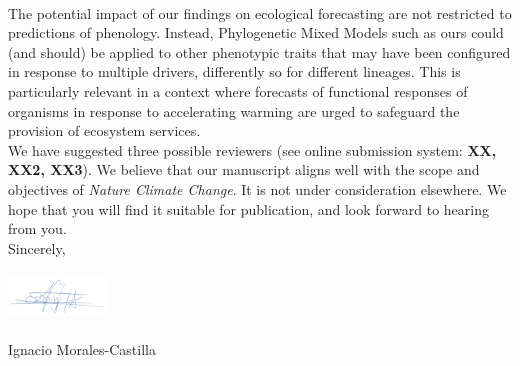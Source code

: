 \documentclass[11pt,a4paper]{letter}
\begin{document}
\begin{letter}{}
\vspace{1.5ex}\\
The potential impact of our findings on ecological forecasting are not restricted to predictions of phenology. Instead, Phylogenetic Mixed Models such as ours could (and should) be applied to other phenotypic traits that may have been configured in response to multiple drivers, differently so for different lineages. This is particularly relevant in a context where forecasts of functional responses of organisms in response to accelerating warming are urged to safeguard the provision of ecosystem services.
\vspace{1.5ex}\\
We have suggested three possible reviewers (see online submission system: {\bf XX, XX2, XX3}). We believe that our manuscript aligns well with the scope and objectives of \emph{Nature Climate Change}. It is not under consideration elsewhere. We hope that you will find it suitable for publication, and look forward to hearing from you.
\vspace{1.5ex}\\
\noindent Sincerely,\\
\vspace{1.5ex}\\
 \includegraphics[width=0.2\textwidth]{Signature_IMC.png} \\
 \vspace{1.5ex}\\
\noindent Ignacio Morales-Castilla


\end{letter}
\end{document}
